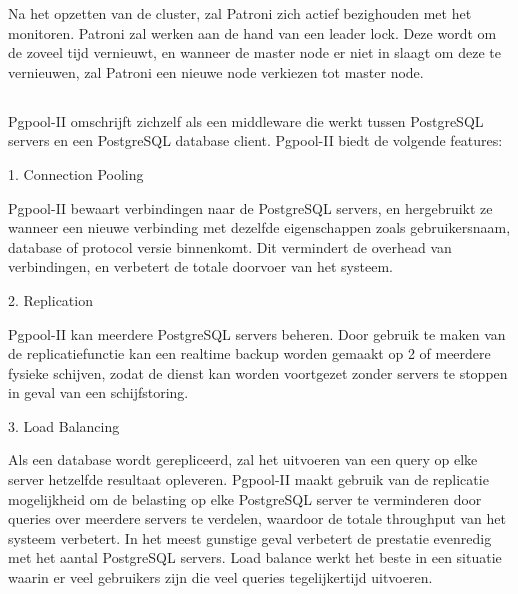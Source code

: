 Na het opzetten van de cluster, zal Patroni zich actief bezighouden met het monitoren. Patroni zal werken aan de hand van een leader lock. Deze wordt om de zoveel tijd vernieuwt, en wanneer de master node er niet in slaagt om deze te vernieuwen, zal Patroni een nieuwe node verkiezen tot master node. %


\subsection{}
\label{subsec:Pgpool-II}


Pgpool-II omschrijft zichzelf als een middleware die werkt tussen PostgreSQL servers en een PostgreSQL database client. Pgpool-II biedt de volgende features:

1. Connection Pooling

Pgpool-II bewaart verbindingen naar de PostgreSQL servers, en hergebruikt ze wanneer een nieuwe verbinding met dezelfde eigenschappen zoals gebruikersnaam, database of protocol versie binnenkomt. Dit vermindert de overhead van verbindingen, en verbetert de totale doorvoer van het systeem.

2. Replication

Pgpool-II kan meerdere PostgreSQL servers beheren. Door gebruik te maken van de replicatiefunctie kan een realtime backup worden gemaakt op 2 of meerdere fysieke schijven, zodat de dienst kan worden voortgezet zonder servers te stoppen in geval van een schijfstoring.

3. Load Balancing

Als een database wordt gerepliceerd, zal het uitvoeren van een query op elke server hetzelfde resultaat opleveren. Pgpool-II maakt gebruik van de replicatie mogelijkheid om de belasting op elke PostgreSQL server te verminderen door queries over meerdere servers te verdelen, waardoor de totale throughput van het systeem verbetert. In het meest gunstige geval verbetert de prestatie evenredig met het aantal PostgreSQL servers. Load balance werkt het beste in een situatie waarin er veel gebruikers zijn die veel queries tegelijkertijd uitvoeren.

